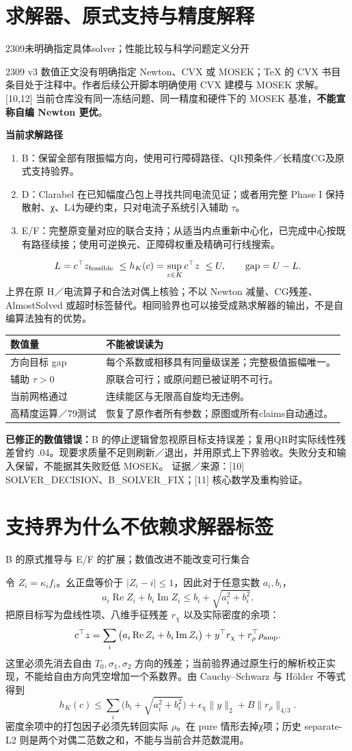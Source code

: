 \documentclass[11pt,a4paper]{article}
\newcommand{\Ppage}[3]{\clearpage\section{#1}\label{#2}{\small\color{muted}#3}\par\vspace{2mm}}
\newcommand{\src}[1]{{\scriptsize\color{muted}证据／来源：#1}\par}
\begin{document}
\Ppage{求解器、原式支持与精度解释}{solver}{2309未明确指定具体solver；性能比较与科学问题定义分开}
2309 v3 数值正文没有明确指定 Newton、CVX 或 MOSEK；TeX 的 CVX 书目条目处于注释中。作者后续公开脚本明确使用 CVX 建模与 MOSEK 求解。[10,12] 当前仓库没有同一冻结问题、同一精度和硬件下的 MOSEK 基准，\textbf{不能宣称自编 Newton 更优}。

\textbf{当前求解路径}
\begin{enumerate}
\item B：保留全部有限振幅方向，使用可行障碍路径、QR预条件／长精度CG及原式支持验界。
\item D：Clarabel 在已知幅度凸包上寻找共同电流见证；或者用完整 Phase I 保持散射、χ、L4为硬约束，只对电流子系统引入辅助 \(\tau\)。
\item E/F：完整原变量对应的联合支持；从适当内点重新中心化，已完成中心按既有路径续接；使用可逆换元、正障碍权重及精确可行线搜索。
\end{enumerate}
\[
L=c^\top z_{\rm feasible}\ \le h_K(c)=\sup_{z\in K}c^\top z\ \le U,
\qquad \mathrm{gap}=U-L.
\]
上界在原 H／电流算子和合法对偶上核验；不以 Newton 减量、CG残差、AlmostSolved 或超时标签替代。相同验界也可以接受成熟求解器的输出，不是自编算法独有的优势。

\begin{tabularx}{\linewidth}{@{}p{41mm}Y@{}}\toprule
数值量&不能被误读为\\\midrule
方向目标 gap&每个系数或相移具有同量级误差；完整极值振幅唯一。\\
辅助 \(\tau>0\)&原联合可行；或原问题已被证明不可行。\\
当前网格通过&连续能区与无限高自旋均无违例。\\
高精度运算／79测试&恢复了原作者所有参数；原图或所有claims自动通过。\\\bottomrule
\end{tabularx}
\textbf{已修正的数值错误：}B 的停止逻辑曾忽视原目标支持误差；复用QR时实际线性残差曾约 .04。现要求质量不足则刷新／退出，并用原式上下界验收。失败分支和输入保留，不能据其失败贬低 MOSEK。
\src{[10] SOLVER\_DECISION、B\_SOLVER\_FIX；[11] 核心数学及重构验证。}

\Ppage{支持界为什么不依赖求解器标签}{supportmath}{B 的原式推导与 E/F 的扩展；数值改进不能改变可行集合}
令 \(Z_i=\kappa_i f_i\)。幺正盘等价于 \(|Z_i-i|\le1\)，因此对于任意实数 \(a_i,b_i\)，
\[
a_i\operatorname{Re}Z_i+b_i\operatorname{Im}Z_i
\le b_i+\sqrt{a_i^2+b_i^2}.
\]
把原目标写为盘线性项、八维手征残差 \(r_\chi\) 以及实际密度的余项：
\[
c^\top z=\sum_i\big(a_i\operatorname{Re}Z_i+
b_i\operatorname{Im}Z_i\big)+y^\top r_\chi+
r_\rho^\top\rho_{\rm amp}.
\]
这里必须先消去自由 \(T_0,\sigma_1,\sigma_2\) 方向的残差；当前验界通过原生行的解析校正实现，不能给自由方向凭空增加一个系数界。由 Cauchy--Schwarz 与 Hölder 不等式得到
\[
\boxed{\quad
h_K(c)\le
\sum_i\big(b_i+\sqrt{a_i^2+b_i^2}\big)
+\epsilon_\chi\|y\|_2+B\|r_\rho\|_{4/3}.
\quad}
\]
密度余项中的打包因子必须先转回实际 \(\rho\)。在 pure 情形去掉χ项；历史 separate-L2 则是两个对偶二范数之和，不能与当前合并范数混用。
\end{document}
